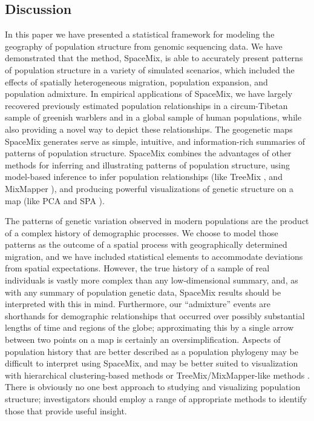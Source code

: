 \documentclass[10pt,letterpaper]{article}
\begin{document}
\subsection*{Discussion}
In this paper we have presented a statistical framework for modeling the geography of population structure from genomic sequencing data.
We have demonstrated that the method, SpaceMix, is able to accurately present patterns of population structure in a variety of simulated scenarios, which included the effects of spatially heterogeneous migration, population expansion, and population admixture.  In empirical applications of SpaceMix, we have largely recovered previously estimated population relationships in a circum-Tibetan sample of greenish warblers and in a global sample of human populations, while also providing a novel way to depict these relationships.  The geogenetic maps SpaceMix generates serve as simple, intuitive, and information-rich summaries of patterns of population structure. 
SpaceMix combines the advantages of other methods for inferring and illustrating patterns of population structure, 
using model-based inference to infer population relationships (like TreeMix \cite{Treemix}, and MixMapper \cite{lipson_mixmapper_2013}), 
and producing powerful visualizations of genetic structure on a map (like PCA \cite{Patterson2006} and SPA \cite{yang_spatial_2014}).

The patterns of genetic variation observed in modern populations are the product of a complex history of demographic processes.  We choose to model those patterns as the outcome of a spatial process with geographically determined migration,
and we have included statistical elements to accommodate deviations from spatial expectations.
However, the true history of a sample of real individuals is vastly more complex than any low-dimensional summary,
and, as with any summary of population genetic data, 
SpaceMix results should be interpreted with this in mind.
Furthermore, our ``admixture'' events are shorthands for demographic relationships
that occurred over possibly substantial lengths of time and regions of the globe;
approximating this by a single arrow between two points on a map is certainly an oversimplification.
Aspects of population history that are better described as a population phylogeny may be difficult to interpret using SpaceMix,
and may be better suited to visualization with hierarchical clustering-based methods \cite{STRUCTURE} or TreeMix/MixMapper-like methods \cite{Treemix,lipson_mixmapper_2013}.  
There is obviously no one best approach to studying and visualizing population structure;
investigators should employ a range of appropriate methods to identify those that provide useful insight. 
\end{document}
